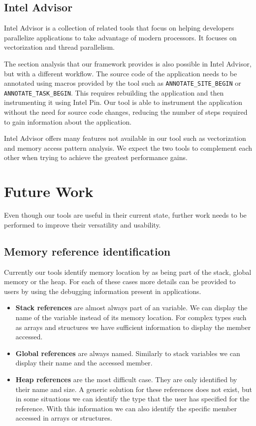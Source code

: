 \subsection{Intel Advisor}

Intel Advisor \cite{inteladvisor} is a collection of related tools that focus on helping developers parallelize applications to take advantage of modern processors. It focuses on vectorization and thread parallelism.

The section analysis that our framework provides is also possible in Intel Advisor, but with a different workflow. The source code of the application needs to be annotated using macros provided by the tool such as \texttt{ANNOTATE\_SITE\_BEGIN} or \texttt{ANNOTATE\_TASK\_BEGIN}. This requires rebuilding the application and then instrumenting it using Intel Pin. Our tool is able to instrument the application without the need for source code changes, reducing the number of steps required to gain information about the application.

Intel Advisor offers many features not available in our tool such as vectorization and memory access pattern analysis. We expect the two tools to complement each other when trying to achieve the greatest performance gains.

\section{Future Work}

Even though our tools are useful in their current state, further work needs to be performed to improve their versatility and usability.

\subsection{Memory reference identification}

Currently our tools identify memory location by as being part of the stack, global memory or the heap. For each of these cases more details can be provided to users by using the debugging information present in applications.

\begin{itemize}
	\item \textbf{Stack references} are almost always part of an variable. We can display the name of the variable instead of its memory location. For complex types such as arrays and structures we have sufficient information to display the member accessed.
	
	\item \textbf{Global references} are always named. Similarly to stack variables we can display their name and the accessed member.
	
	\item \textbf{Heap references} are the most difficult case. They are only identified by their name and size. A generic solution for these references does not exist, but in some situations we can identify the type that the user has specified for the reference. With this information we can also identify the specific member accessed in arrays or structures. 
\end{itemize}

